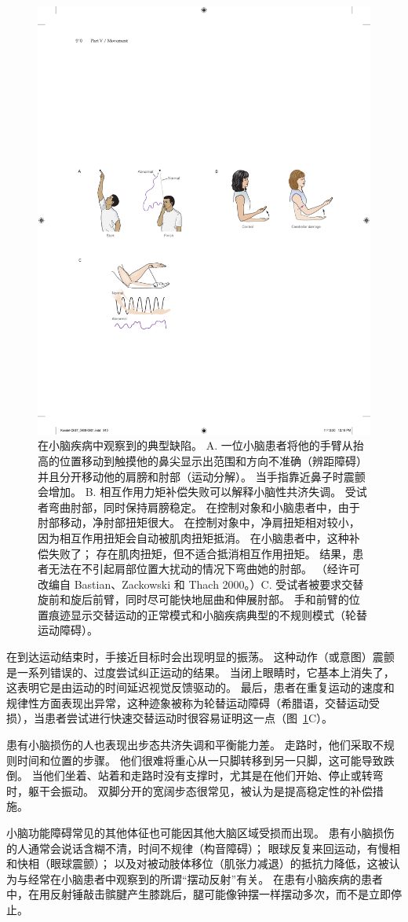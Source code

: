 \begin{figure}[htbp]
	\centering
	\includegraphics[width=0.5\linewidth]{chap37/fig_37_1}
	\caption{在小脑疾病中观察到的典型缺陷。
		A. 一位小脑患者将他的手臂从抬高的位置移动到触摸他的鼻尖显示出范围和方向不准确（辨距障碍）并且分开移动他的肩膀和肘部（运动分解）。 
		当手指靠近鼻子时震颤会增加。 
		B. 相互作用力矩补偿失败可以解释小脑性共济失调。 受试者弯曲肘部，同时保持肩膀稳定。 在控制对象和小脑患者中，由于肘部移动，净肘部扭矩很大。 在控制对象中，净肩扭矩相对较小，因为相互作用扭矩会自动被肌肉扭矩抵消。 在小脑患者中，这种补偿失败了； 存在肌肉扭矩，但不适合抵消相互作用扭矩。 结果，患者无法在不引起肩部位置大扰动的情况下弯曲她的肘部。 （经许可改编自 Bastian、Zackowski 和 Thach 2000。）C. 受试者被要求交替旋前和旋后前臂，同时尽可能快地屈曲和伸展肘部。 手和前臂的位置痕迹显示交替运动的正常模式和小脑疾病典型的不规则模式（轮替运动障碍）。}
	\label{fig:37_1}
\end{figure}


在到达运动结束时，手接近目标时会出现明显的振荡。
这种动作（或意图）震颤是一系列错误的、过度尝试纠正运动的结果。
当闭上眼睛时，它基本上消失了，这表明它是由运动的时间延迟视觉反馈驱动的。
最后，患者在重复运动的速度和规律性方面表现出异常，这种迹象被称为轮替运动障碍（希腊语，交替运动受损），当患者尝试进行快速交替运动时很容易证明这一点（图~\ref{fig:37_1}C）。


患有小脑损伤的人也表现出步态共济失调和平衡能力差。 走路时，他们采取不规则时间和位置的步骤。
他们很难将重心从一只脚转移到另一只脚，这可能导致跌倒。
当他们坐着、站着和走路时没有支撑时，尤其是在他们开始、停止或转弯时，躯干会振动。
双脚分开的宽阔步态很常见，被认为是提高稳定性的补偿措施。


小脑功能障碍常见的其他体征也可能因其他大脑区域受损而出现。
患有小脑损伤的人通常会说话含糊不清，时间不规律（构音障碍）；
眼球反复来回运动，有慢相和快相（眼球震颤）；
以及对被动肢体移位（肌张力减退）的抵抗力降低，这被认为与经常在小脑患者中观察到的所谓“摆动反射”有关。
在患有小脑疾病的患者中，在用反射锤敲击髌腱产生膝跳后，腿可能像钟摆一样摆动多次，而不是立即停止。



